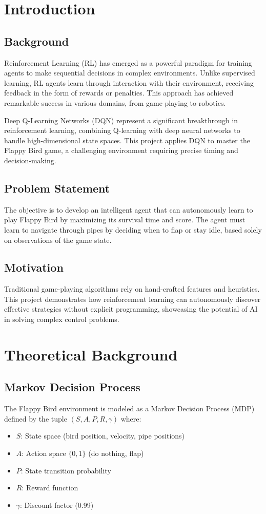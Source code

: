 \documentclass[12pt,a4paper]{article}
\begin{document}
\clearpage
\section{Introduction}

\subsection{Background}
Reinforcement Learning (RL) has emerged as a powerful paradigm for training agents to make sequential decisions in complex environments. Unlike supervised learning, RL agents learn through interaction with their environment, receiving feedback in the form of rewards or penalties. This approach has achieved remarkable success in various domains, from game playing to robotics.

Deep Q-Learning Networks (DQN) represent a significant breakthrough in reinforcement learning, combining Q-learning with deep neural networks to handle high-dimensional state spaces. This project applies DQN to master the Flappy Bird game, a challenging environment requiring precise timing and decision-making.

\subsection{Problem Statement}
The objective is to develop an intelligent agent that can autonomously learn to play Flappy Bird by maximizing its survival time and score. The agent must learn to navigate through pipes by deciding when to flap or stay idle, based solely on observations of the game state.

\subsection{Motivation}
Traditional game-playing algorithms rely on hand-crafted features and heuristics. This project demonstrates how reinforcement learning can autonomously discover effective strategies without explicit programming, showcasing the potential of AI in solving complex control problems.

\section{Theoretical Background}

\subsection{Markov Decision Process}
The Flappy Bird environment is modeled as a Markov Decision Process (MDP) defined by the tuple $(S, A, P, R, \gamma)$ where:
\begin{itemize}
    \item $S$: State space (bird position, velocity, pipe positions)
    \item $A$: Action space $\{0, 1\}$ (do nothing, flap)
    \item $P$: State transition probability
    \item $R$: Reward function
    \item $\gamma$: Discount factor (0.99)
\end{itemize}
\end{document}
